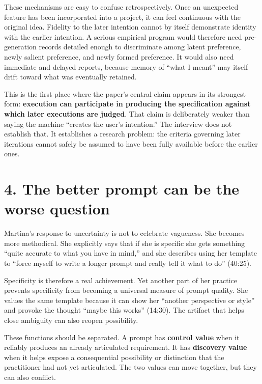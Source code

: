 \documentclass[
  11pt,
  letterpaper,
]{article}
\begin{document}
These mechanisms are easy to confuse retrospectively. Once an unexpected
feature has been incorporated into a project, it can feel continuous
with the original idea. Fidelity to the later intention cannot by itself
demonstrate identity with the earlier intention. A serious empirical
program would therefore need pre-generation records detailed enough to
discriminate among latent preference, newly salient preference, and
newly formed preference. It would also need immediate and delayed
reports, because memory of ``what I meant'' may itself drift toward what
was eventually retained.

This is the first place where the paper's central claim appears in its
strongest form: \textbf{execution can participate in producing the
specification against which later executions are judged}. That claim is
deliberately weaker than saying the machine ``creates the user's
intention.'' The interview does not establish that. It establishes a
research problem: the criteria governing later iterations cannot safely
be assumed to have been fully available before the earlier ones.

\section{4. The better prompt can be the worse
question}\label{the-better-prompt-can-be-the-worse-question}

Martina's response to uncertainty is not to celebrate vagueness. She
becomes more methodical. She explicitly says that if she is specific she
gets something ``quite accurate to what you have in mind,'' and she
describes using her template to ``force myself to write a longer prompt
and really tell it what to do'' (40:25).

Specificity is therefore a real achievement. Yet another part of her
practice prevents specificity from becoming a universal measure of
prompt quality. She values the same template because it can show her
``another perspective or style'' and provoke the thought ``maybe this
works'' (14:30). The artifact that helps close ambiguity can also reopen
possibility.

These functions should be separated. A prompt has \textbf{control value}
when it reliably produces an already articulated requirement. It has
\textbf{discovery value} when it helps expose a consequential
possibility or distinction that the practitioner had not yet
articulated. The two values can move together, but they can also
conflict.
\end{document}
